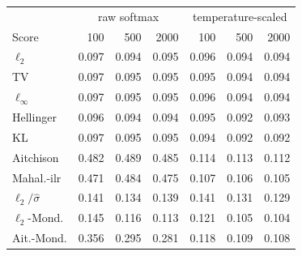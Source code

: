 \begin{tabular}{lrrrrrr}
\toprule
 & \multicolumn{3}{c}{raw softmax} & \multicolumn{3}{c}{temperature-scaled} \\
Score & 100 & 500 & 2000 & 100 & 500 & 2000 \\
\midrule
$\ell_2$ & 0.097 & 0.094 & 0.095 & 0.096 & 0.094 & 0.094 \\
TV & 0.097 & 0.095 & 0.095 & 0.095 & 0.094 & 0.094 \\
$\ell_\infty$ & 0.097 & 0.095 & 0.095 & 0.096 & 0.094 & 0.094 \\
Hellinger & 0.096 & 0.094 & 0.094 & 0.095 & 0.092 & 0.093 \\
KL & 0.097 & 0.095 & 0.095 & 0.094 & 0.092 & 0.092 \\
Aitchison & 0.482 & 0.489 & 0.485 & 0.114 & 0.113 & 0.112 \\
Mahal.-ilr & 0.471 & 0.484 & 0.475 & 0.107 & 0.106 & 0.105 \\
$\ell_2/\hat\sigma$ & 0.141 & 0.134 & 0.139 & 0.141 & 0.131 & 0.129 \\
$\ell_2$-Mond. & 0.145 & 0.116 & 0.113 & 0.121 & 0.105 & 0.104 \\
Ait.-Mond. & 0.356 & 0.295 & 0.281 & 0.118 & 0.109 & 0.108 \\
\bottomrule
\end{tabular}